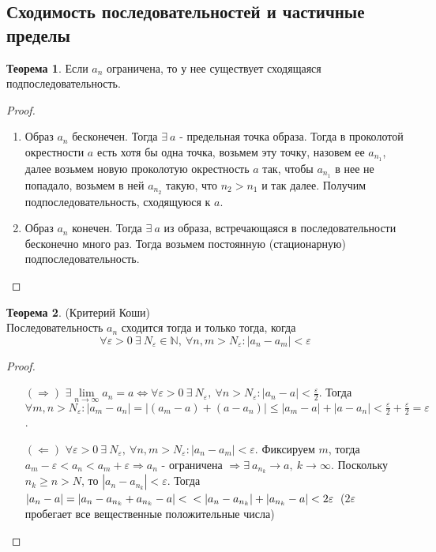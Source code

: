 \documentclass[a4paper, 12pt]{article}
\newcommand{\N}{\mathbb{N}}
\renewcommand{\epsilon}{\varepsilon}
\newcommand\tab[1][.5cm]{\hspace*{#1}}
\newcommand{\lims}{\lim\limits_{n\to \infty}}
\theoremstyle{definition}
\newtheorem*{theorem}{Теорема}
\begin{document}
    \subsection{Сходимость последовательностей и частичные пределы}
        \begin{theorem}
            Если $a_n$ ограничена, то у нее существует сходящаяся подпоследовательность. 
        \end{theorem}
        \begin{proof}\tab
            \begin{enumerate}
                \item Образ $a_n$ бесконечен. Тогда $\exists\ a$ - предельная точка образа. Тогда в проколотой окрестности $a$ есть хотя бы одна точка, возьмем эту точку, назовем ее $a_{n_1}$, далее возьмем новую проколотую окрестность $a$ так, чтобы $a_{n_1}$ в нее не попадало, возьмем в ней $a_{n_2}$ такую, что $n_2>n_1$ и так далее. Получим подпоследовательность, сходящуюся к $a$. 
                \item Образ $a_n$ конечен. Тогда $\exists\ a$ из образа, встречающаяся в последовательности бесконечно много раз. Тогда возьмем постоянную (стационарную) подпоследовательность.
            \end{enumerate}
        \end{proof} 
        \begin{theorem} (Критерий Коши)\\
            Последовательность $a_n$ сходится тогда и только тогда, когда
            \[\forall \epsilon>0\ \exists\ N_{\epsilon}\in \N,\ \forall n,m>N_{\epsilon}: |a_n-a_m|<\epsilon\]
        \end{theorem} 
        \begin{proof}\tab
            \begin{itemize}
                \item[$(\Rightarrow)$] $\exists \lims a_n =a \Leftrightarrow \forall \epsilon>0\ \exists\ N_{\epsilon},\ \forall n>N_{\epsilon}: |a_n-a|<\frac{\epsilon}{2}$. Тогда $\forall m,n>N_{\epsilon}: |a_m-a_n|=|(a_m-a)+(a-a_n)|\leq |a_m-a|+|a-a_n|<\frac{\epsilon}{2}+\frac{\epsilon}{2}=\epsilon$. 
                \item[$(\Leftarrow)$] $\forall \epsilon>0\ \exists\ N_{\epsilon},\ \forall n,m>N_{\epsilon}: |a_n-a_m|<\epsilon$. Фиксируем $m$, тогда\\ $a_m-\epsilon<a_n<a_m+\epsilon \Rightarrow a_n$ - ограничена $\Rightarrow \exists\ a_{n_k}\to a,\ k\to \infty$. Поскольку $n_k\geq n > N$, то $|a_n-a_{n_k}|<\epsilon$. Тогда $|a_n-a|=|a_n-a_{n_k}+a_{n_k}-a|<\\<|a_n-a_{n_k}|+|a_{n_k}-a|<2\epsilon$\ ($2\epsilon$ пробегает все вещественные положительные числа) 
            \end{itemize}
        \end{proof} 
\end{document}
